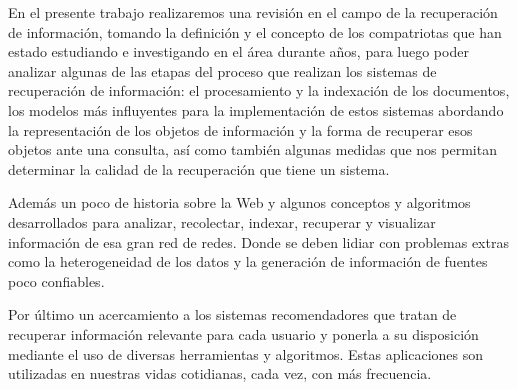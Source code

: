 En el presente trabajo realizaremos una revisión en el campo de la recuperación de información, tomando la definición y el concepto de los compatriotas que han estado estudiando e investigando en el área durante años, para luego poder analizar algunas de las etapas del proceso que realizan los sistemas de recuperación de información: el procesamiento y la indexación de los documentos, los modelos más influyentes para la implementación de estos sistemas abordando la representación de los objetos de información y la forma de recuperar esos objetos ante una consulta, así como también algunas medidas que nos permitan determinar la calidad de la recuperación que tiene un sistema. \par

Además un poco de historia sobre la Web y algunos conceptos y algoritmos desarrollados para analizar, recolectar, indexar, recuperar y visualizar información de esa gran red de redes. Donde se deben lidiar con problemas extras como la heterogeneidad de los datos y la generación de información de fuentes poco confiables.\par

Por último un acercamiento a los sistemas recomendadores que tratan de recuperar información relevante para cada usuario y ponerla a su disposición mediante el uso de diversas herramientas y algoritmos. Estas aplicaciones son utilizadas en nuestras vidas cotidianas, cada vez, con más frecuencia.
